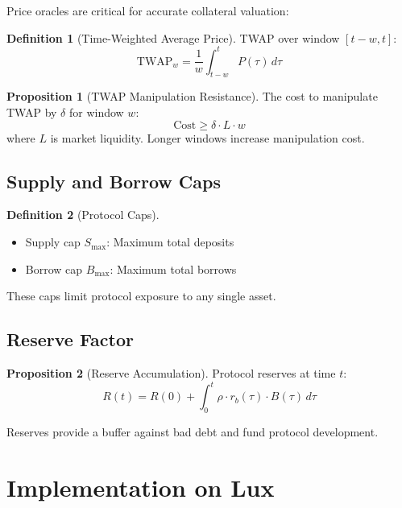 \documentclass[11pt,a4paper]{article}
\theoremstyle{definition}
\newtheorem{definition}{Definition}
\newtheorem{proposition}{Proposition}
\begin{document}
Price oracles are critical for accurate collateral valuation:

\begin{definition}[Time-Weighted Average Price]
TWAP over window $[t-w, t]$:
\begin{equation}
\text{TWAP}_w = \frac{1}{w} \int_{t-w}^{t} P(\tau) \, d\tau
\end{equation}
\end{definition}

\begin{proposition}[TWAP Manipulation Resistance]
The cost to manipulate TWAP by $\delta$ for window $w$:
\begin{equation}
\text{Cost} \geq \delta \cdot L \cdot w
\end{equation}
where $L$ is market liquidity. Longer windows increase manipulation cost.
\end{proposition}

\subsection{Supply and Borrow Caps}

\begin{definition}[Protocol Caps]
\begin{itemize}
\item Supply cap $S_{\max}$: Maximum total deposits
\item Borrow cap $B_{\max}$: Maximum total borrows
\end{itemize}
\end{definition}

These caps limit protocol exposure to any single asset.

\subsection{Reserve Factor}

\begin{proposition}[Reserve Accumulation]
Protocol reserves at time $t$:
\begin{equation}
R(t) = R(0) + \int_0^t \rho \cdot r_b(\tau) \cdot B(\tau) \, d\tau
\end{equation}
\end{proposition}

Reserves provide a buffer against bad debt and fund protocol development.

\section{Implementation on Lux}
\end{document}
